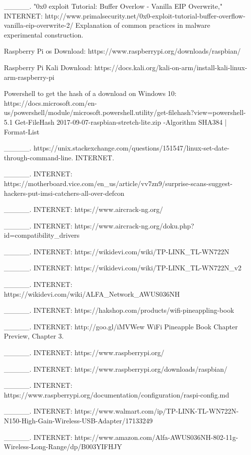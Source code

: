 \_\_\_\_\_. "0x0 \gls{exploit} Tutorial: Buffer Overlow - Vanilla EIP Overwrite," INTERNET: http://www.primalsecurity.net/0x0-\gls{exploit}-tutorial-buffer-overflow-vanilla-eip-overwrite-2/ Explanation of common practices in \gls{malware} experimental construction.

Raspberry Pi \gls{os} Download: https://www.raspberrypi.org/downloads/raspbian/

Raspberry Pi Kali Download: https://docs.kali.org/kali-on-arm/install-kali-linux-arm-raspberry-pi

Powershell to get the \gls{hash} of a download on Windows 10: https://docs.microsoft.com/en-us/powershell/module/microsoft.powershell.utility/get-filehash?view=powershell-5.1 Get-FileHash 2017-09-07-raspbian-stretch-lite.zip -Algorithm SHA384 | Format-List

\_\_\_\_\_. https://unix.stackexchange.com/questions/151547/linux-set-date-through-command-line. INTERNET.

\_\_\_\_\_. INTERNET: https://\gls{motherboard}.vice.com/en\_us/article/vv7zn9/surprise-scans-suggest-hackers-put-imsi-catchers-all-over-defcon

\_\_\_\_\_. INTERNET: https://www.aircrack-ng.org/

\_\_\_\_\_. INTERNET: https://www.aircrack-ng.org/doku.php?id=compatibility\_drivers

\_\_\_\_\_. INTERNET: https://wikidevi.com/wiki/TP-LINK\_TL-WN722N

\_\_\_\_\_. INTERNET: https://wikidevi.com/wiki/TP-LINK\_TL-WN722N\_v2

\_\_\_\_\_. INTERNET: https://wikidevi.com/wiki/ALFA\_Network\_AWUS036NH

\_\_\_\_\_. INTERNET: https://hakshop.com/products/wifi-pineappling-book

\_\_\_\_\_. INTERNET: http://goo.gl/iMVWew WiFi Pineapple Book Chapter Preview, Chapter 3.

\_\_\_\_\_. INTERNET: https://www.raspberrypi.org/

\_\_\_\_\_. INTERNET: https://www.raspberrypi.org/downloads/raspbian/

\_\_\_\_\_. INTERNET: https://www.raspberrypi.org/documentation/\gls{configuration}/raspi-config.md

\_\_\_\_\_. INTERNET: https://www.walmart.com/ip/TP-LINK-TL-WN722N-N150-High-Gain-Wireless-USB-Adapter/17133249

\_\_\_\_\_. INTERNET: https://www.amazon.com/Alfa-AWUS036NH-802-11g-Wireless-Long-Range/dp/B003YIFHJY

